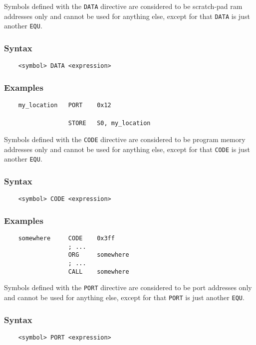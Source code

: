     \clearpage
        Symbols defined with the \texttt{DATA} directive are considered to be scratch-pad ram addresses only and cannot be used for anything else, except for that \texttt{DATA} is just another \texttt{EQU}.

        \subsubsection{Syntax}
            \verb'    <symbol> DATA <expression>'

        \subsubsection{Examples}
            \verb'    my_location   PORT    0x12'\\
            \verb''\\
            \verb'                  STORE   S0, my_location'

        Symbols defined with the \texttt{CODE} directive are considered to be program memory addresses only and cannot be used for anything else, except for that \texttt{CODE} is just another \texttt{EQU}.

        \subsubsection{Syntax}
            \verb'    <symbol> CODE <expression>'

        \subsubsection{Examples}
            \verb'    somewhere     CODE    0x3ff'\\
            \verb'                  ; ...'\\
            \verb'                  ORG     somewhere'\\
            \verb'                  ; ...'\\
            \verb'                  CALL    somewhere'

        Symbols defined with the \texttt{PORT} directive are considered to be port addresses only and cannot be used for anything else, except for that \texttt{PORT} is just another \texttt{EQU}.

        \subsubsection{Syntax}
            \verb'    <symbol> PORT <expression>'


